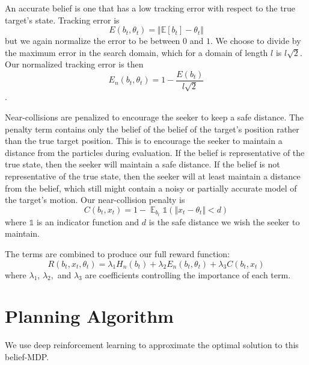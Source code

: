 \documentclass[10pt,twocolumn,letterpaper]{article}
\begin{document}
An accurate belief is one that has a low tracking error with respect to the true target's state.
Tracking error is
\begin{equation}
E(b_t, \theta_t) = \Vert \mathbb{E}{[ b_t ]} - \theta_t \Vert
\label{tracking_unnormalized}
\end{equation}
but we again normalize the error to be between $0$ and $1$.
We choose to divide by the maximum error in the search domain, which for a domain of length $l$ is $l\sqrt{2}$.
Our normalized tracking error is then
\begin{equation}
E_{n}(b_t, \theta_t) = 1 - \frac{E(b_t)}{l\sqrt{2}}
\label{tracking_normalized}
\end{equation}.

Near-collisions are penalized to encourage the seeker to keep a safe distance.
The penalty term contains only the belief of the belief of the target's position rather than the true target position.
This is to encourage the seeker to maintain a distance from the particles during evaluation.
If the belief is representative of the true state, then the seeker will maintain a safe distance.
If the belief is not representative of the true state, then the seeker will at least maintain a distance from the belief, which still might contain a noisy or partially accurate model of the target's motion.
Our near-collision penalty is
\begin{equation}
C(b_t, x_t) = 1 - \mathop{{}\mathbb{E}}_{b_t} \mathds{1} (\Vert x_t - \theta_t\Vert < d)
\label{collision_penalty}
\end{equation}
where $\mathds{1}$ is an indicator function and $d$ is the safe distance we wish the seeker to maintain.

The terms are combined to produce our full reward function:
\begin{equation}
R(b_t, x_t, \theta_t) = \lambda_1 H_{n}(b_t) + \lambda_2 E_{n}(b_t, \theta_t) + \lambda_3 C(b_t, x_t)
\label{reward_function}
\end{equation}
where $\lambda_1$, $\lambda_2,$ and $\lambda_3$ are coefficients controlling the importance of each term.

\section{Planning Algorithm}
We use deep reinforcement learning to approximate the optimal solution to this belief-MDP.
\end{document}

